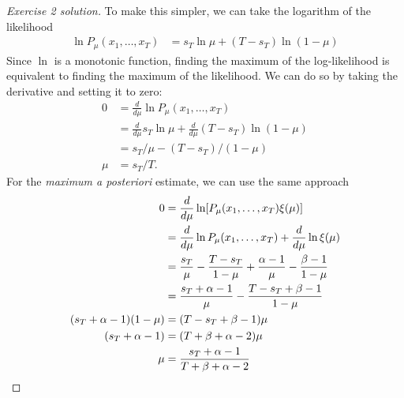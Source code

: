 \documentclass[twoside,a4paper]{article}
\begin{document}
  \begin{proof}[Exercise 2 solution]
    To make this simpler, we can take the logarithm of the likelihood
    \begin{align*}
      \ln P_\mu(x_1, \ldots, x_T)
      &=  s_T \ln \mu + (T - s_T) \ln (1 - \mu)
    \end{align*}
    Since $\ln$ is a monotonic function, finding the maximum of the log-likelihood is equivalent to finding the maximum of the likelihood. We can do so by taking the derivative and setting it to zero:
    \begin{align*}
      0 &= \frac{d}{d\mu} \ln P_\mu(x_1, \ldots, x_T)\\
        &=  \frac{d}{d\mu} s_T \ln \mu + \frac{d}{d\mu}  (T - s_T) \ln (1 - \mu)\\
        &=   s_T/\mu  - (T - s_T) / (1 - \mu)\\
      \mu &=   s_T /T.
    \end{align*}
    For the \emph{maximum a posteriori} estimate, we can use the same approach
    \begin{align*}
      0 &=\frac{d}{d\mu} \ln [P_\mu(x_1, \ldots, x_T) \xi(\mu)]\\
      &=
        \frac{d}{d\mu} \ln P_\mu(x_1, \ldots, x_T) + \frac{d}{d\mu} \ln \xi(\mu)\\
      &=
        \frac{s_T}{\mu} - \frac{T - s_T}{1 - \mu}
        +
        \frac{\alpha - 1}{\mu} -  \frac{\beta - 1}{1 - \mu}\\
      &=
        \frac{s_T + \alpha - 1}{\mu}  - \frac{T - s_T + \beta - 1}{1 - \mu}\\
      (s_T + \alpha - 1)(1 - \mu) &= (T - s_T + \beta - 1) \mu\\
      (s_T + \alpha - 1)  &= (T + \beta + \alpha - 2 ) \mu\\
      \mu & = \frac{s_T + \alpha - 1}{T + \beta + \alpha - 2 }
    \end{align*}
  \end{proof}
\fi
\end{document}
